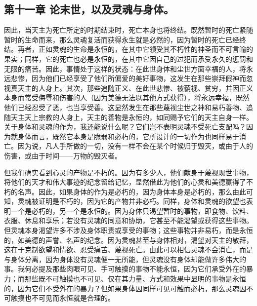 
\subsection{第十一章 论末世，以及灵魂与身体。}

因此，当天主为死亡所定的时期结束时，死亡本身也将终结。既然暂时的死亡紧随暂时的生命而来，那么灵魂复活而获得永生就是必然的，因为暂时的死亡已经终结。再者，正如灵魂的生命是永恒的，在其中它领受其不朽性的神圣而不可言喻的果实；同样，它的死亡也必是永恒的，在其中它因自己的过犯而承受永久的惩罚和无限的痛苦。因此，事情处于这样的状态：在此世身体和尘世方面幸福的人，将永远悲惨，因为他们已经享受了他们所偏爱的美好事物，这发生在那些崇拜假神而忽视真天主的人身上。其次，那些追随正义、在此世悲惨、被藐视、贫穷，并因正义本身而常受侮辱和伤害的人（因为美德无法以其他方式获得），将永远幸福，既然他们已经忍受了恶，也当享受善。这显然发生在那些蔑视尘世之神和易朽善物、追随天主天上宗教的人身上，天主的善物是永恒的，如同赐予它们的天主自身一样。关于身体和灵魂的作为，我还能说什么呢？它们岂不表明灵魂不受死亡支配吗？因为就身体而言，既然它本身是脆弱和必朽的，它所设计的一切作为也同样易于消亡。因为说，凡人手所做的一切，没有一样不会在某个时候归于毁灭，或由于人的伤害，或由于时间——万物的毁灭者。\par

但我们确实看到心灵的产物是不朽的。因为有多少人，他们献身于蔑视现世事物，将他们的天才和伟大事迹的纪念留给记忆，显然借此为他们的心灵和美德赢得了不朽的名声。因此，如果身体的作为是必朽的，因为身体本身是必朽的，那么由此可知，灵魂被证明是不朽的，因为它的产物并非必朽。同样，身体和灵魂的欲望也表明一个是必朽的，另一个是永恒的。因为身体只渴望暂时的事物，即食物、饮料、衣服、休息和享乐；若没有灵魂的同意和协助，它甚至不能渴望或获得这些事物。但灵魂本身渴望许多不涉及身体职责或享受的事物；这些事物并非易朽，而是永恒的，如美德的声誉、名声的纪念。因为灵魂甚至与身体相对，渴望对天主的敬拜，这在于克制欲望和情欲、忍受痛苦、蔑视死亡。由此可以相信灵魂不会消亡，而是与身体分离，因为身体没有灵魂便一无所能，但灵魂没有身体却能做许多伟大的事。我何必提及那些肉眼可见、手可触摸的事物不能永恒，因为它们承受外在的暴力；而那些既不可触摸也不可见、仅在其力量、方式和效果中显明的事物是永恒的，因为它们不受外在的暴力？但如果身体因同样可见可触而必朽，那么灵魂因不可触摸也不可见而永恒就是合理的。\par


